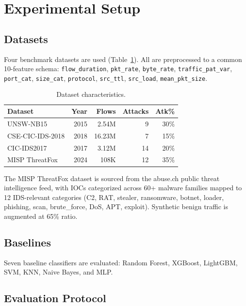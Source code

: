 \documentclass[conference]{IEEEtran}
\begin{document}
\section{Experimental Setup}
\label{sec:experiments}

\subsection{Datasets}

Four benchmark datasets are used (Table~\ref{tab:datasets}). All are preprocessed to a common 10-feature schema: \texttt{flow\_duration}, \texttt{pkt\_rate}, \texttt{byte\_rate}, \texttt{traffic\_pat\_var}, \texttt{port\_cat}, \texttt{size\_cat}, \texttt{protocol}, \texttt{src\_ttl}, \texttt{src\_load}, \texttt{mean\_pkt\_size}.

\begin{table}[htbp]
\centering
\caption{Dataset characteristics.}
\label{tab:datasets}
\footnotesize
\begin{tabular}{lrrrr}
\toprule
\textbf{Dataset} & \textbf{Year} & \textbf{Flows} & \textbf{Attacks} & \textbf{Atk\%} \\
\midrule
UNSW-NB15 & 2015 & 2.54M & 9 & 30\% \\
CSE-CIC-IDS-2018 & 2018 & 16.23M & 7 & 15\% \\
CIC-IDS2017 & 2017 & 3.12M & 14 & 20\% \\
MISP ThreatFox & 2024 & 108K & 12 & 35\% \\
\bottomrule
\end{tabular}
\end{table}

The MISP ThreatFox dataset is sourced from the abuse.ch public threat intelligence feed, with IOCs categorized across 60+ malware families mapped to 12 IDS-relevant categories (C2, RAT, stealer, ransomware, botnet, loader, phishing, scan, brute\_force, DoS, APT, exploit). Synthetic benign traffic is augmented at 65\% ratio.

\subsection{Baselines}

Seven baseline classifiers are evaluated: Random Forest, XGBoost, LightGBM, SVM, KNN, Naive Bayes, and MLP.

\subsection{Evaluation Protocol}
\end{document}
